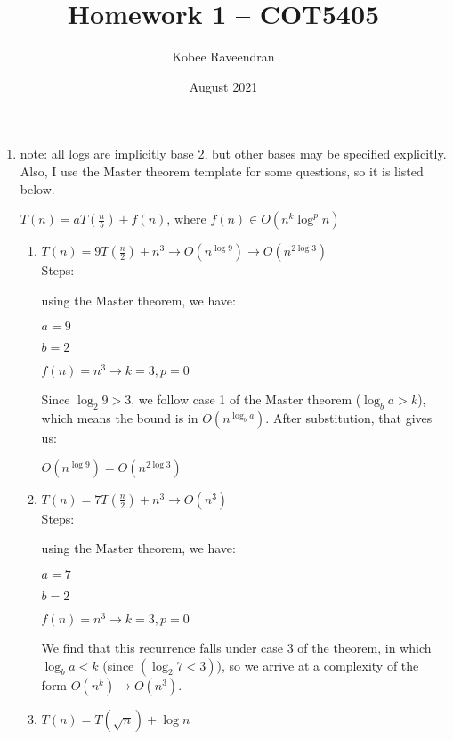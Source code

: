 \documentclass[12pt]{article}
\title{Homework 1 -- COT5405}
\author{Kobee Raveendran}
\date{August 2021}
\begin{document}
\maketitle

\begin{enumerate}
    \item note: all logs are implicitly base 2, but other bases may be specified explicitly. Also, I use the Master theorem 
    template for some questions, so it is listed below.
    
    $T(n) = aT(\frac{n}{b}) + f(n)$, where $f(n) \in O(n^k\log^pn)$
    
    \begin{enumerate}
        \item $T(n) = 9T(\frac{n}{2})+n^3 \longrightarrow O(n^{\log9}) \longrightarrow O(n^{2\log3})$ \\
        
        Steps: 
        
        using the Master theorem, we have:
        
        $a = 9$
        
        $b = 2$
        
        $f(n) = n^3 \longrightarrow k = 3, p = 0$
        
        Since $\log_{2}9 > 3$, we follow case 1 of the Master theorem ($\log_{b}a > k$), which means the bound is in 
        $O(n^{\log_{b}a})$. After substitution, that gives us:
        
        $O(n^{\log9}) = O(n^{2\log3})$\\
        
        \item $T(n) = 7T(\frac{n}{2}) + n^3 \longrightarrow O(n^3)$ \\
        
        Steps:
        
        using the Master theorem, we have:
        
        $a = 7$
        
        $b = 2$
        
        $f(n) = n^3 \longrightarrow k = 3, p = 0$
        
        We find that this recurrence falls under case 3 of the theorem, in which $\log_{b}{a} < k$ 
        (since $(\log_{2}{7} < 3)$), so we arrive at a complexity of the form $O(n^k) \longrightarrow O(n^3)$.\\
        
        \item $T(n) = T(\sqrt{n}) + \log n$
        

\end{enumerate}
\end{enumerate}
\end{document}
